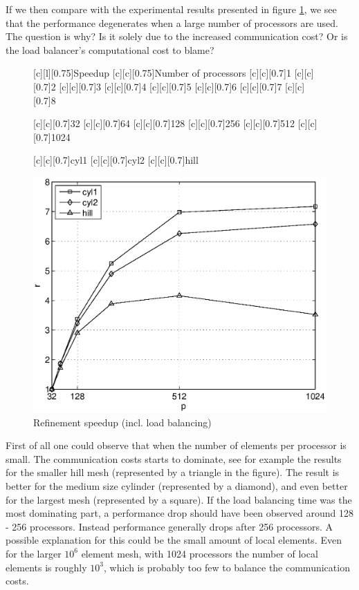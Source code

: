 If we then compare with the experimental results presented in figure
\ref{fig:refsp}, we see that the performance degenerates when a large
number of processors are used. The question is why? Is it solely due
to the increased communication cost? Or is the load balancer's
computational cost to blame?
\begin{figure}[hbt]
  [c][l][0.75]{Speedup}
  [c][c][0.75]{Number of processors}
  [c][c][0.7]{1}
  [c][c][0.7]{2}
  [c][c][0.7]{3}
  [c][c][0.7]{4}
  [c][c][0.7]{5}
  [c][c][0.7]{6}
  [c][c][0.7]{7}
  [c][c][0.7]{8}

  [c][c][0.7]{32}
  [c][c][0.7]{64}
  [c][c][0.7]{128}
  [c][c][0.7]{256}
  [c][c][0.7]{512}
  [c][c][0.7]{1024}

  [c][c][0.7]{cyl1}
  [c][c][0.7]{cyl2}
  [c][c][0.7]{hill}

  \begin{center}
      \includegraphics[width=0.55\columnwidth]{chapters/hoffman-4/eps/speedup.eps}
      \caption{Refinement speedup (incl. load balancing)}
      \label{fig:refsp}
  \end{center}
\end{figure}

First of all one could observe that when the number of elements per
processor is small. The communication costs starts to dominate, see
for example the results for the smaller hill mesh (represented by a
triangle in the figure). The result is better for the medium size
cylinder (represented by a diamond), and even better for the largest
mesh (represented by a square). If the load balancing time was the
most dominating part, a performance drop should have been observed
around 128 - 256 processors. Instead performance generally drops after
256 processors. A possible explanation for this could be the small
amount of local elements. Even for the larger $10^6$ element mesh,
with 1024 processors the number of local elements is roughly $10^3$,
which is probably too few to balance the communication costs.


